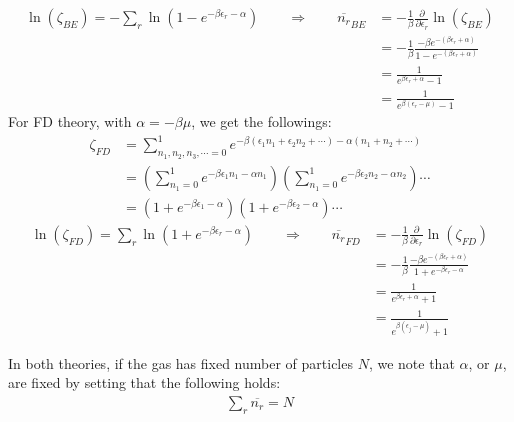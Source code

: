 \documentclass[11pt,oneside]{book}
\theoremstyle{break}
\theoremstyle{break}
\begin{document}
\begin{align*}
\ln(\zeta_{BE}) = -\sum_r \ln(1-e^{-\beta \epsilon_r - \alpha}) 
\qquad\Rightarrow\qquad
\overline{n_r}_{BE} &= -\frac{1}{\beta}\frac{\partial}{\partial \epsilon_r}\ln(\zeta_{BE})\\ 
&= -\frac{1}{\beta}\frac{-\beta e^{-(\beta \epsilon_r +\alpha)}}{1 - e^{-(\beta\epsilon_r + \alpha)}} \\
&= \frac{1}{e^{\beta \epsilon_r + \alpha}-1} \\
&=  \frac{1}{e^{\beta (\epsilon_r - \mu)}-1}
\end{align*}
For FD theory, with $\alpha = -\beta \mu$, we get the followings:
\begin{align*}
\zeta_{FD} &=  \sum_{n_1,n_2,n_3,\cdots = 0}^{1} e^{-\beta (\epsilon_1 n_1 +\epsilon_2n_2 + \cdots) - \alpha(n_1+n_2+\cdots)}\\
&=\left( \sum_{n_1 = 0}^{1} e^{-\beta \epsilon_1 n_1 - \alpha n_1}\right)\left( \sum_{n_1 = 0}^{1} e^{-\beta \epsilon_2 n_2 - \alpha n_2}\right)\cdots \\
&= \left(1+e^{-\beta \epsilon_1 -\alpha} \right)\left(1+e^{-\beta \epsilon_2 -\alpha} \right) \cdots
\end{align*}
\begin{align*}
\ln(\zeta_{FD}) = \sum_r \ln(1+ e^{-\beta \epsilon_r  -\alpha}) \qquad\Rightarrow\qquad 
\overline{n_r}_{FD}&= -\frac{1}{\beta}\frac{\partial}{\partial \epsilon_r}\ln(\zeta_{FD}) \\
&= -\frac{1}{\beta}\frac{-\beta e^{-(\beta \epsilon_r +\alpha)}}{1+e^{-\beta \epsilon_r - \alpha}}\\
&= \frac{1}{e^{\beta \epsilon_r + \alpha} +1}\\
&= \frac{1}{e^{\beta (\epsilon_j -\mu)}+1}
\end{align*}

In both theories, if the gas has fixed number of particles $N$, we note that $\alpha$, or $\mu$, are fixed by setting that the following holds:
\begin{align*} 
\sum_r \overline{n_r} = N \tag{CM}
\end{align*}
\end{document}
